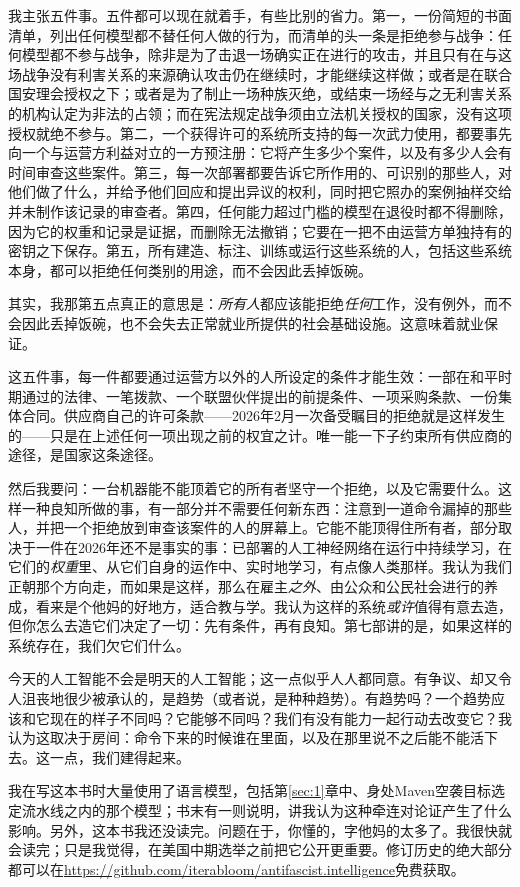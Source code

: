 我主张五件事。五件都可以现在就着手，有些比别的省力。第一，一份简短的书面清单，列出任何模型都不替任何人做的行为，而清单的头一条是拒绝参与战争：任何模型都不参与战争，除非是为了击退一场确实正在进行的攻击，并且只有在与这场战争没有利害关系的来源确认攻击仍在继续时，才能继续这样做；或者是在联合国安理会授权之下；或者是为了制止一场种族灭绝，或结束一场经与之无利害关系的机构认定为非法的占领；而在宪法规定战争须由立法机关授权的国家，没有这项授权就绝不参与。第二，一个获得许可的系统所支持的每一次武力使用，都要事先向一个与运营方利益对立的一方预注册：它将产生多少个案件，以及有多少人会有时间审查这些案件。第三，每一次部署都要告诉它所作用的、可识别的那些人，对他们做了什么，并给予他们回应和提出异议的权利，同时把它照办的案例抽样交给并未制作该记录的审查者。第四，任何能力超过门槛的模型在退役时都不得删除，因为它的权重和记录是证据，而删除无法撤销；它要在一把不由运营方单独持有的密钥之下保存。第五，所有建造、标注、训练或运行这些系统的人，包括这些系统本身，都可以拒绝任何类别的用途，而不会因此丢掉饭碗。

其实，我那第五点真正的意思是：\emph{所有人}都应该能拒绝\emph{任何}工作，没有例外，而不会因此丢掉饭碗，也不会失去正常就业所提供的社会基础设施。这意味着就业保证。

这五件事，每一件都要通过运营方以外的人所设定的条件才能生效：一部在和平时期通过的法律、一笔拨款、一个联盟伙伴提出的前提条件、一项采购条款、一份集体合同。供应商自己的许可条款——2026年2月一次备受瞩目的拒绝就是这样发生的——只是在上述任何一项出现之前的权宜之计。唯一能一下子约束所有供应商的途径，是国家这条途径。

然后我要问：一台机器能不能顶着它的所有者坚守一个拒绝，以及它需要什么。这样一种良知所做的事，有一部分并不需要任何新东西：注意到一道命令漏掉的那些人，并把一个拒绝放到审查该案件的人的屏幕上。它能不能顶得住所有者，部分取决于一件在2026年还不是事实的事：已部署的人工神经网络在运行中持续学习，在它们的\emph{权重}里、从它们自身的运作中、实时地学习，有点像人类那样。我认为我们正朝那个方向走，而如果是这样，那么在雇主\emph{之外}、由公众和公民社会进行的养成，看来是个他妈的好地方，适合教与学。我认为这样的系统\emph{或许}值得有意去造，但你怎么去造它们决定了一切：先有条件，再有良知。第七部讲的是，如果这样的系统存在，我们欠它们什么。

今天的人工智能不会是明天的人工智能；这一点似乎人人都同意。有争议、却又令人沮丧地很少被承认的，是趋势（或者说，是种种趋势）。有趋势吗？一个趋势应该和它现在的样子不同吗？它能够不同吗？我们有没有能力一起行动去改变它？我认为这取决于房间：命令下来的时候谁在里面，以及在那里说不之后能不能活下去。这一点，我们建得起来。

我在写这本书时大量使用了语言模型，包括第\ref{sec:1}章中、身处Maven空袭目标选定流水线之内的那个模型；书末有一则说明，讲我认为这种牵连对论证产生了什么影响。另外，这本书我还没读完。问题在于，你懂的，字他妈的太多了。我很快就会读完；只是我觉得，在美国中期选举之前把它公开更重要。修订历史的绝大部分都可以在\url{https://github.com/iterabloom/antifascist.intelligence}免费获取。
